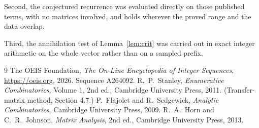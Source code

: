 \documentclass[11pt,a4paper]{article}
\theoremstyle{plain}
\theoremstyle{definition}
\begin{document}
Second, the conjectured recurrence was evaluated directly on those published terms, with no
matrices involved, and holds wherever the proved range and the data overlap.

Third, the annihilation test of Lemma~\ref{lem:crit} was carried out in exact integer
arithmetic on the whole vector rather than on a sampled prefix.

\begin{thebibliography}{9}
 The OEIS Foundation, \emph{The On-Line Encyclopedia of Integer
Sequences}, \url{https://oeis.org}, 2026. Sequence A264092.
 R.~P.~Stanley, \emph{Enumerative Combinatorics}, Volume 1, 2nd ed.,
Cambridge University Press, 2011. (Transfer-matrix method, Section 4.7.)
 P.~Flajolet and R.~Sedgewick, \emph{Analytic Combinatorics}, Cambridge
University Press, 2009.
 R.~A.~Horn and C.~R.~Johnson, \emph{Matrix Analysis}, 2nd ed., Cambridge
University Press, 2013.
\end{thebibliography}
\end{document}
